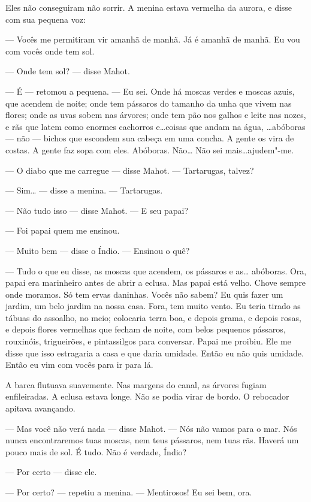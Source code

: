 Eles não conseguiram não sorrir. A menina estava vermelha da aurora, e
disse com sua pequena voz:

--- Vocês me permitiram vir amanhã de manhã. Já é amanhã de manhã. Eu
vou com vocês onde tem sol.

--- Onde tem sol? --- disse Mahot.

--- É --- retomou a pequena. --- Eu sei. Onde há moscas verdes e moscas azuis,
que acendem de noite; onde tem pássaros do tamanho da unha que vivem nas
flores; onde as uvas sobem nas árvores; onde tem pão nos galhos e leite
nas nozes, e rãs que latem como enormes cachorros e\ldots{}coisas que andam na
água, \ldots{}abóboras --- não --- bichos que escondem sua cabeça em uma concha. A
gente os vira de costas. A gente faz sopa com eles. Abóboras. Não\ldots{} Não
sei mais\ldots{}ajudem"-me.

--- O diabo que me carregue --- disse Mahot. --- Tartarugas, talvez?

--- Sim\ldots{} --- disse a menina. --- Tartarugas.

--- Não tudo isso --- disse Mahot. --- E seu papai?

--- Foi papai quem me ensinou.

--- Muito bem --- disse o Índio. --- Ensinou o quê?

--- Tudo o que eu disse, as moscas que acendem, os pássaros e as\ldots{}
abóboras. Ora, papai era marinheiro antes de abrir a eclusa. Mas papai
está velho. Chove sempre onde moramos. Só tem ervas daninhas. Vocês não
sabem? Eu quis fazer um jardim, um belo jardim na nossa casa. Fora, tem
muito vento. Eu teria tirado as tábuas do assoalho, no meio; colocaria
terra boa, e depois grama, e depois rosas, e depois flores vermelhas que
fecham de noite, com belos pequenos pássaros, rouxinóis, trigueirões, e
pintassilgos para conversar. Papai me proibiu. Ele me disse que isso
estragaria a casa e que daria umidade. Então eu não quis umidade. Então eu
vim com vocês para ir para lá.

A barca flutuava suavemente. Nas margens do canal, as árvores fugiam
enfileiradas. A eclusa estava longe. Não se podia virar de bordo. O
rebocador apitava avançando.

--- Mas você não verá nada --- disse Mahot. --- Nós não vamos para o mar. Nós
nunca encontraremos tuas moscas, nem teus pássaros, nem tuas rãs. Haverá
um pouco mais de sol. É tudo. Não é verdade, Índio?

--- Por certo --- disse ele.

--- Por certo? --- repetiu a menina.  --- Mentirosos! Eu sei bem, ora.

